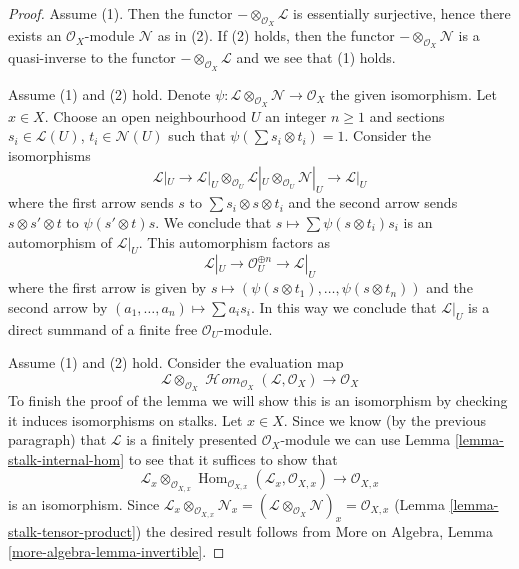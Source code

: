 \documentclass[10pt,a4paper]{amsart}
\theoremstyle{plain}
\theoremstyle{definition}
\theoremstyle{remark}
\numberwithin{equation}{subsection}
\def\Hom{\mathop{\mathrm{Hom}}\nolimits}
\def\SheafHom{\mathop{\mathcal{H}\!\mathit{om}}\nolimits}
\begin{document}
\begin{proof}
Assume (1). Then the functor $- \otimes_{\mathcal{O}_X} \mathcal{L}$
is essentially surjective, hence there exists an $\mathcal{O}_X$-module
$\mathcal{N}$ as in (2). If (2) holds, then the functor
$- \otimes_{\mathcal{O}_X} \mathcal{N}$ is a quasi-inverse
to the functor $- \otimes_{\mathcal{O}_X} \mathcal{L}$ and
we see that (1) holds.

\medskip\noindent
Assume (1) and (2) hold. Denote
$\psi : \mathcal{L} \otimes_{\mathcal{O}_X} \mathcal{N} \to \mathcal{O}_X$
the given isomorphism. Let $x \in X$. Choose an open neighbourhood
$U$ an integer $n \geq 1$ and sections $s_i \in \mathcal{L}(U)$,
$t_i \in \mathcal{N}(U)$ such that $\psi(\sum s_i \otimes t_i) = 1$.
Consider the isomorphisms
$$
\mathcal{L}|_U \to
\mathcal{L}|_U \otimes_{\mathcal{O}_U}
\mathcal{L}|_U \otimes_{\mathcal{O}_U} \mathcal{N}|_U \to \mathcal{L}|_U
$$
where the first arrow sends $s$ to $\sum s_i \otimes s \otimes t_i$
and the second arrow sends $s \otimes s' \otimes t$ to $\psi(s' \otimes t)s$.
We conclude that $s \mapsto \sum \psi(s \otimes t_i)s_i$ is
an automorphism of $\mathcal{L}|_U$. This automorphism factors as
$$
\mathcal{L}|_U \to \mathcal{O}_U^{\oplus n} \to \mathcal{L}|_U
$$
where the first arrow is given by
$s \mapsto (\psi(s \otimes t_1), \ldots, \psi(s \otimes t_n))$
and the second arrow by $(a_1, \ldots, a_n) \mapsto \sum a_i s_i$.
In this way we conclude that $\mathcal{L}|_U$ is a direct summand
of a finite free $\mathcal{O}_U$-module.

\medskip\noindent
Assume (1) and (2) hold. Consider the evaluation map
$$
\mathcal{L} \otimes_{\mathcal{O}_X}
\SheafHom_{\mathcal{O}_X}(\mathcal{L}, \mathcal{O}_X)
\longrightarrow \mathcal{O}_X
$$
To finish the proof of the lemma
we will show this is an isomorphism by checking it induces
isomorphisms on stalks. Let $x \in X$.
Since we know (by the previous paragraph)
that $\mathcal{L}$ is a finitely presented
$\mathcal{O}_X$-module
we can use Lemma \ref{lemma-stalk-internal-hom}
to see that it suffices to show that
$$
\mathcal{L}_x \otimes_{\mathcal{O}_{X, x}}
\Hom_{\mathcal{O}_{X, x}}(\mathcal{L}_x, \mathcal{O}_{X, x})
\longrightarrow \mathcal{O}_{X, x}
$$
is an isomorphism. Since
$\mathcal{L}_x \otimes_{\mathcal{O}_{X, x}} \mathcal{N}_x =
(\mathcal{L} \otimes_{\mathcal{O}_X} \mathcal{N})_x =
\mathcal{O}_{X, x}$ (Lemma \ref{lemma-stalk-tensor-product})
the desired result follows from
More on Algebra, Lemma \ref{more-algebra-lemma-invertible}.
\end{proof}
\end{document}

